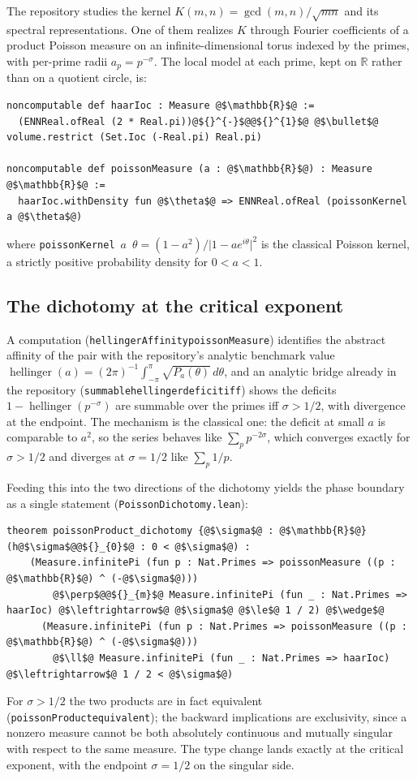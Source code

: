 \documentclass[a4paper,UKenglish,autoref,thm-restate]{lipics-v2021}
\newcommand{\leanid}[1]{{\def\_{\textunderscore\allowbreak}\texttt{#1}}}
\begin{document}
The repository \cite{riemannvenue} studies the kernel
$K(m,n) = \gcd(m,n)/\sqrt{mn}$ and its spectral representations. One of them
realizes $K$ through Fourier coefficients of a product Poisson measure on an
infinite-dimensional torus indexed by the primes, with per-prime radii
$a_p = p^{-\sigma}$. The local model at each prime, kept on $\mathbb{R}$
rather than on a quotient circle, is:
\begin{lstlisting}
noncomputable def haarIoc : Measure @$\mathbb{R}$@ :=
  (ENNReal.ofReal (2 * Real.pi))@${}^{-}$@@${}^{1}$@ @$\bullet$@ volume.restrict (Set.Ioc (-Real.pi) Real.pi)

noncomputable def poissonMeasure (a : @$\mathbb{R}$@) : Measure @$\mathbb{R}$@ :=
  haarIoc.withDensity fun @$\theta$@ => ENNReal.ofReal (poissonKernel a @$\theta$@)
\end{lstlisting}
where \leanid{poissonKernel}~$a$~$\theta = (1-a^2)/\lvert 1 - a
e^{i\theta}\rvert^2$ is the classical Poisson kernel, a strictly positive
probability density for $0 < a < 1$.

\subsection{The dichotomy at the critical exponent}
\label{sec:app-dichotomy}

A computation
(\leanid{hellingerAffinity\_poissonMeasure}) identifies the abstract affinity
of the pair with the repository's analytic benchmark value
$\operatorname{hellinger}(a) = (2\pi)^{-1} \int_{-\pi}^{\pi}
\sqrt{P_a(\theta)}\, d\theta$, and an analytic bridge already in the
repository (\leanid{summable\_hellinger\_deficit\_iff}) shows the deficits
$1 - \operatorname{hellinger}(p^{-\sigma})$ are summable over the primes iff
$\sigma > 1/2$, with divergence at the endpoint. The mechanism is the
classical one: the deficit at small $a$ is comparable to $a^2$, so the series
behaves like $\sum_p p^{-2\sigma}$, which converges exactly for
$\sigma > 1/2$ and diverges at $\sigma = 1/2$ like $\sum_p 1/p$.

Feeding this into the two directions of the dichotomy yields the phase
boundary as a single statement (\texttt{PoissonDichotomy.lean}):
\begin{lstlisting}
theorem poissonProduct_dichotomy {@$\sigma$@ : @$\mathbb{R}$@} (h@$\sigma$@@${}_{0}$@ : 0 < @$\sigma$@) :
    (Measure.infinitePi (fun p : Nat.Primes => poissonMeasure ((p : @$\mathbb{R}$@) ^ (-@$\sigma$@)))
        @$\perp$@@${}_{m}$@ Measure.infinitePi (fun _ : Nat.Primes => haarIoc) @$\leftrightarrow$@ @$\sigma$@ @$\le$@ 1 / 2) @$\wedge$@
      (Measure.infinitePi (fun p : Nat.Primes => poissonMeasure ((p : @$\mathbb{R}$@) ^ (-@$\sigma$@)))
        @$\ll$@ Measure.infinitePi (fun _ : Nat.Primes => haarIoc) @$\leftrightarrow$@ 1 / 2 < @$\sigma$@)
\end{lstlisting}
For $\sigma > 1/2$ the two products are in fact equivalent
(\leanid{poissonProduct\_equivalent}); the backward implications are
exclusivity, since a nonzero measure cannot be both absolutely continuous and
mutually singular with respect to the same measure. The type change lands
exactly at the critical exponent, with the endpoint $\sigma = 1/2$ on the
singular side.
\end{document}
